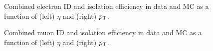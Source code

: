 \begin{figure}[htb]
\caption{Combined electron ID and isolation efficiency in data and MC as a
function of (left) $\eta$ and (right) $p_{\mathrm{T}}$.}
\label{fig:electronIdIso}
\end{figure}

\begin{figure}[htb]
\caption{Combined muon ID and isolation efficiency in data and MC as a function
of (left) $\eta$ and (right) $p_{\mathrm{T}}$.}
\label{fig:muonIdIso}
\end{figure}

